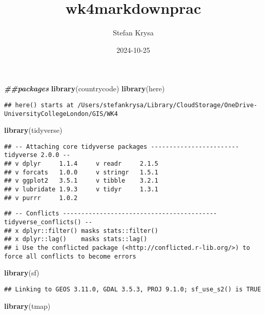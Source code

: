 \documentclass[
]{article}
\title{wk4markdownprac}
\author{Stefan Krysa}
\date{2024-10-25}
\newenvironment{Shaded}{\begin{snugshade}}{\end{snugshade}}
\newcommand{\DocumentationTok}[1]{\textcolor[rgb]{0.56,0.35,0.01}{\textbf{\textit{#1}}}}
\newcommand{\FunctionTok}[1]{\textcolor[rgb]{0.13,0.29,0.53}{\textbf{#1}}}
\newcommand{\NormalTok}[1]{#1}
\begin{document}
\maketitle

\begin{Shaded}
\begin{Highlighting}[]
\DocumentationTok{\#\#packages}
\FunctionTok{library}\NormalTok{(countrycode)}
\FunctionTok{library}\NormalTok{(here)}
\end{Highlighting}
\end{Shaded}

\begin{verbatim}
## here() starts at /Users/stefankrysa/Library/CloudStorage/OneDrive-UniversityCollegeLondon/GIS/WK4
\end{verbatim}

\begin{Shaded}
\begin{Highlighting}[]
\FunctionTok{library}\NormalTok{(tidyverse)}
\end{Highlighting}
\end{Shaded}

\begin{verbatim}
## -- Attaching core tidyverse packages ------------------------ tidyverse 2.0.0 --
## v dplyr     1.1.4     v readr     2.1.5
## v forcats   1.0.0     v stringr   1.5.1
## v ggplot2   3.5.1     v tibble    3.2.1
## v lubridate 1.9.3     v tidyr     1.3.1
## v purrr     1.0.2
\end{verbatim}

\begin{verbatim}
## -- Conflicts ------------------------------------------ tidyverse_conflicts() --
## x dplyr::filter() masks stats::filter()
## x dplyr::lag()    masks stats::lag()
## i Use the conflicted package (<http://conflicted.r-lib.org/>) to force all conflicts to become errors
\end{verbatim}

\begin{Shaded}
\begin{Highlighting}[]
\FunctionTok{library}\NormalTok{(sf)}
\end{Highlighting}
\end{Shaded}

\begin{verbatim}
## Linking to GEOS 3.11.0, GDAL 3.5.3, PROJ 9.1.0; sf_use_s2() is TRUE
\end{verbatim}

\begin{Shaded}
\begin{Highlighting}[]
\FunctionTok{library}\NormalTok{(tmap)}
\end{Highlighting}
\end{Shaded}
\end{document}
